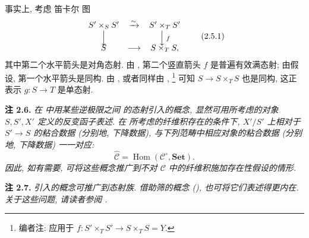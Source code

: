 事实上, 考虑 笛卡尔 图
\[
\begin{array}{ccc}
  S'\times_SS' & \xrightarrow{\sim} & S'\times_TS' \\
  \Big\downarrow & & \Big\downarrow\,\scriptstyle f \\[-0.25em]
  S & \longrightarrow & S\times_TS ,
\end{array}
\tag{2.5.1}\label{sga3:iv:corollary:2:5:eq:2:5:1:01}
\]
其中第二个水平箭头是对角态射. 由
, 第二个竖直箭头 \(f\)
是普遍有效满态射; 由假设, 第一个水平箭头是同构.
由 ,
或者同样由 ,
\footnote{编者注: 应用于 \(f:S'\times_TS'\to S\times_TS=Y\).}
可知 \(S\to S\times_TS\) 也是同构, 这正表示
\(g:S\to T\) 是单态射.

\medskip
\noindent{}\textbf{注 2.6.}
\textit{在  中用某些逆极限之间
的态射引入的概念, 显然可用所考虑的对象 \(S,S',X'\) 定义的反变函子表述.
在  所考虑的纤维积存在的条件下,
\(X'/S'\) 上相对于 \(S'\to S\) 的粘合数据 (分别地, 下降数据),
与下列范畴中相应对象的粘合数据 (分别地, 下降数据) 一一对应:}
\[
  \widehat{\mathscr C}
  =\operatorname{Hom}(\mathscr C^{\circ},\mathbf{Set}).
\]
\textit{因此, 如有需要, 可将这些概念推广到不对
\(\mathscr C\) 中的纤维积施加存在性假设的情形.}

\medskip
\noindent{}\textbf{注 2.7.}
\textit{引入的概念可推广到态射族.
借助筛的概念 (),
也可将它们表述得更内在. 关于这些问题, 请读者参阅
.}
